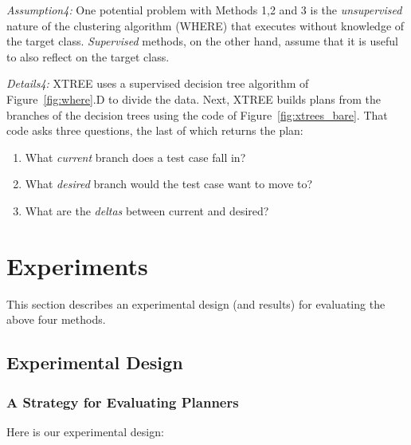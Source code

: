 \documentclass{sig-alternate}
\newcommand{\be}{\begin{enumerate}}
\newcommand{\ee}{\end{enumerate}}
\newcommand{\fig}[1]{Figure~\ref{fig:#1}}
\begin{document}
{\em Assumption4:} One potential problem with Methods 1,2 and 3 is the {\em unsupervised} nature of
the clustering algorithm (WHERE) that  
executes without knowledge of the target class.  {\em Supervised} methods, on the other hand, assume that it is useful to also reflect on the target class.

{\em Details4:} 
XTREE uses a supervised   decision tree algorithm of \fig{where}.D to divide the data.
Next, XTREE builds plans from the branches of the decision trees using the code of \fig{xtrees_bare}.
That code asks three questions, the last of which returns the plan:
\be
\item
What {\em current} branch does a test case fall in?
\item What {\em desired} branch would the test case want to move to?
\item What are the {\em deltas} between current and desired? 
\ee

\section{Experiments}

  
 

This section describes an experimental design (and results) for evaluating the above four methods. 
\subsection{Experimental Design}

\subsubsection{A Strategy for Evaluating Planners}
 
 Here is our experimental design:
 
\end{document}
